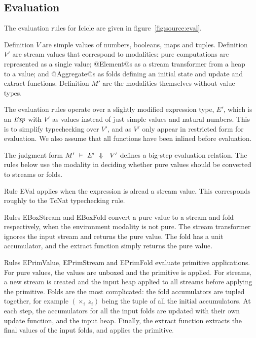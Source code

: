 


\subsection{Evaluation}
The evaluation rules for Icicle are given in figure~\ref{fig:source:eval}.

Definition $V$ are simple values of numbers, booleans, maps and tuples.
Definition $V'$ are stream values that correspond to modalities: pure computations are represented as a single value;
@Element@s as a stream transformer from a heap to a value;
and @Aggregate@s as folds defining an initial state and update and extract functions.
Definition $M'$ are the modalities themselves without value types.


The evaluation rules operate over a slightly modified expression type, $E'$, which is an $\mathit{Exp}$ with $V'$ as values instead of just simple values and natural numbers.
This is to simplify typechecking over $V'$, and as $V'$ only appear in restricted form for evaluation.
We also assume that all functions have been inlined before evaluation.

The judgment form $M'~\vdash~E'~\Downarrow~~V'$ defines a big-step evaluation relation.
The rules below use the modality in deciding whether pure values should be converted to streams or folds.

Rule EVal applies when the expression is alread a stream value.
This corresponds roughly to the TcNat typechecking rule.

Rules EBoxStream and EBoxFold convert a pure value to a stream and fold respectively, when the environment modality is not pure.
The stream transformer ignores the input stream and returns the pure value.
The fold has a unit accumulator, and the extract function simply returns the pure value.

Rules EPrimValue, EPrimStream and EPrimFold evaluate primitive applications.
For pure values, the values are unboxed and the primitive is applied.
For streams, a new stream is created and the input heap applied to all streams before applying the primitive.
Folds are the most complicated: the fold accumulators are tupled together, for example $(\times_i~z_i)$ being the tuple of all the initial accumulators.
At each step, the accumulators for all the input folds are updated with their own update function, and the input heap.
Finally, the extract function extracts the final values of the input folds, and applies the primitive.

